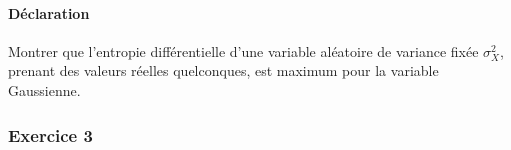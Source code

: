 \documentclass{article}
\begin{document}
\paragraph{Déclaration}Montrer que l'entropie différentielle d'une variable aléatoire de variance fixée $\sigma_{X}^{2}$, prenant des valeurs réelles quelconques, est maximum pour la variable Gaussienne.
\begin{resolution}
    
\end{resolution}

\subsubsection{Exercice 3}
\begin{resolution}
    
\end{resolution}
\end{document}
